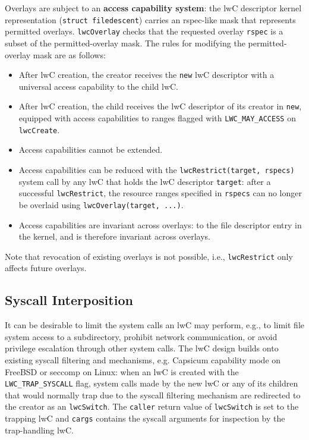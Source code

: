 \documentclass[10pt,twocolumn,a4paper]{article}
\begin{document}
Overlays are subject to an \textbf{access capability system}:
the lwC descriptor kernel representation (\lstinline{struct filedescent}) carries an rspec-like mask that represents permitted overlays.
\lstinline{lwcOverlay} checks that the requested overlay \lstinline{rspec} is a subset of the permitted-overlay mask.
The rules for modifying the permitted-overlay mask are as follows:
\begin{itemize}[nosep]
  \item After lwC creation, the creator receives the \lstinline{new} lwC descriptor with a universal access capability to the child lwC.
  \item After lwC creation, the child receives the lwC descriptor of its creator in \lstinline{new}, equipped with access capabilities to ranges flagged with \lstinline{LWC_MAY_ACCESS} on \lstinline{lwcCreate}.
  \item Access capabilities cannot be extended.
  \item Access capabilities can be reduced with the \lstinline{lwcRestrict(target, rspecs)} system call by any lwC that holds the lwC descriptor \lstinline{target}:
        after a successful \lstinline{lwcRestrict}, the resource ranges specified in \lstinline{rspecs} can no longer be overlaid using \lstinline{lwcOverlay(target, ...)}.
  \item Access capabilities are invariant across overlays: to the file descriptor entry in the kernel, and is therefore invariant across overlays.
\end{itemize}
Note that revocation of existing overlays is not possible, i.e., \lstinline{lwcRestrict} only affects future overlays.
\cite{lwckernelrepo,lwcpaper}

\subsection{Syscall Interposition}\label{design:syscallinterpos}
It can be desirable to limit the system calls an lwC may perform, e.g., to limit file system access to a subdirectory, prohibit network communication, or avoid privilege escalation through other system calls.  
The lwC design builds onto existing syscall filtering and mechanisms, e.g. Capsicum capability mode on FreeBSD or seccomp on Linux:
when an lwC is created with the \lstinline{LWC_TRAP_SYSCALL} flag, system calls made by the new lwC or any of its children that would normally trap due to the syscall filtering mechanism are redirected to the creator as an \lstinline{lwcSwitch}.
The \lstinline{caller} return value of \lstinline{lwcSwitch} is set to the trapping lwC and \lstinline{cargs} contains the syscall arguments for inspection by the trap-handling lwC.
\cite{lwcpaper}
\end{document}
